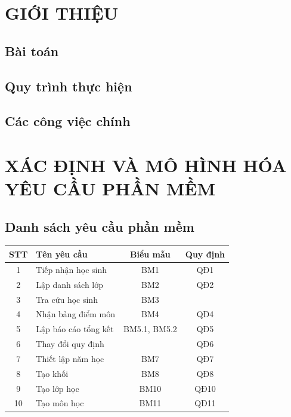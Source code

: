 \documentclass[a4paper]{article}
\begin{document}
\section{GIỚI THIỆU}
\subsection{Bài toán}
\subsection{Quy trình thực hiện}
\subsection{Các công việc chính}

\section{XÁC ĐỊNH VÀ MÔ HÌNH HÓA YÊU CẦU PHẦN MỀM}
	\subsection{Danh sách yêu cầu phần mềm}


\begin{table}[H]
    \centering
    \renewcommand{\arraystretch}{1.5} %
    \setlength{\tabcolsep}{12pt} %
    \begin{tabular}{|c|p{5cm}|c|c|}
  				 
        \hline 			 
        \textbf{STT} & \textbf{Tên yêu cầu} & \textbf{Biểu mẫu} & \textbf{Quy định}  \\ 
        \hline
        1  & Tiếp nhận học sinh & BM1 & QĐ1  \\
        \hline
        2  & Lập danh sách lớp & BM2 & QĐ2  \\
        \hline
        3 & Tra cứu học sinh & BM3 & \\
        \hline
        4 & Nhận bảng điểm môn & BM4 & QĐ4 \\
        \hline
        5 & Lập báo cáo tổng kết & BM5.1, BM5.2 & QĐ5 \\
        \hline
        6 & Thay đổi quy định & & QĐ6 \\
        \hline
         7  & Thiết lập năm học & BM7 & QĐ7\\ 
         \hline
        8 & Tạo khối & BM8 & QĐ8\\
        \hline
        9  & Tạo lớp học & BM10 & QĐ10\\
        \hline
        10 & Tạo môn học & BM11 & QĐ11\\
        \hline
       
    \end{tabular}
\end{table}
\end{document}
